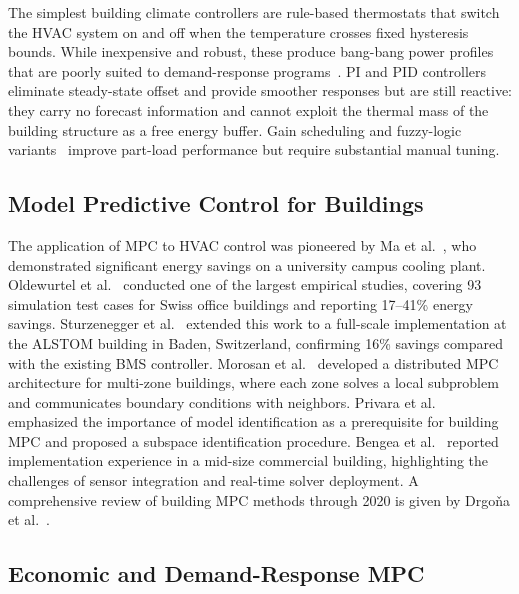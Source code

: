 \documentclass[conference,a4paper]{IEEEtran}[2015/08/26]
\begin{document}
The simplest building climate controllers are rule-based thermostats
that switch the HVAC system on and off when the temperature crosses
fixed hysteresis bounds. While inexpensive and robust, these produce
bang-bang power profiles that are poorly suited to demand-response
programs~\cite{Halvgaard2012}. PI and PID controllers~\cite{Bengea2014}
eliminate steady-state offset and provide smoother responses but are
still reactive: they carry no forecast information and cannot exploit
the thermal mass of the building structure as a free energy buffer.
Gain scheduling and fuzzy-logic variants~\cite{Afram2014} improve
part-load performance but require substantial manual tuning.

\subsection{Model Predictive Control for Buildings}

The application of MPC to HVAC control was pioneered by Ma et
al.~\cite{Ma2012}, who demonstrated significant energy savings on a
university campus cooling plant. Oldewurtel et al.~\cite{Oldewurtel2012}
conducted one of the largest empirical studies, covering 93 simulation
test cases for Swiss office buildings and reporting 17--41\% energy
savings. Sturzenegger et al.~\cite{Sturzenegger2016} extended this work
to a full-scale implementation at the ALSTOM building in Baden,
Switzerland, confirming 16\% savings compared with the existing BMS
controller. Morosan et al.~\cite{Morosan2010} developed a distributed
MPC architecture for multi-zone buildings, where each zone solves a
local subproblem and communicates boundary conditions with neighbors.
Privara et al.~\cite{Privara2013} emphasized the importance of model
identification as a prerequisite for building MPC and proposed a
subspace identification procedure. Bengea et al.~\cite{Bengea2014}
reported implementation experience in a mid-size commercial building,
highlighting the challenges of sensor integration and real-time solver
deployment. A comprehensive review of building MPC methods through 2020
is given by Drgo{\v{n}}a et al.~\cite{Drgona2020}.

\subsection{Economic and Demand-Response MPC}
\end{document}
